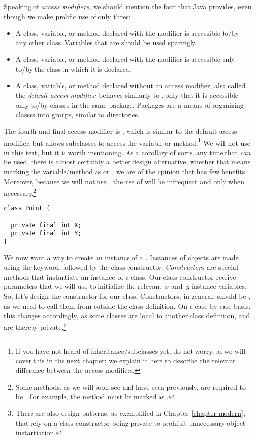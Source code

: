 Speaking of \emph{access modifiers}, we should mention the four that Java provides, even though we make prolific use of only three:

\begin{itemize}
  \item A class, variable, or method declared with the  modifier is accessible to/by any other class. Variables that are  should be used sparingly.
  \item A class, variable, or method declared with the  modifier is accessible only to/by the class in which it is declared. 
  \item A class, variable, or method declared without an access modifier, also called the \emph{default access modifier}, behaves similarly to , only that it is accessible only to/by classes in the same package. Packages are a means of organizing classes into groups, similar to directories.
\end{itemize}

The fourth and final access modifier is , which is similar to the default access modifier, but allows subclasses to access the variable or method.\footnote{If you have not heard of inheritance/subclasses yet, do not worry, as we will cover this in the next chapter; we explain it here to describe the relevant difference between the access modifiers.} 
We will not use  in this text, but it is worth mentioning. 
As a corollary of sorts, any time that  \emph{can} be used, there is almost certainly a better design alternative, whether that means marking the variable/method as  or , we are of the opinion that  has few benefits. 
Moreover, because we will not use , the use of  will be infrequent and only when necessary.\footnote{Some methods, as we will soon see and have seen previously, are required to be . For example, the  method must be marked as .}

\begin{lstlisting}[language=MyJava]
class Point {

  private final int X;
  private final int Y;
}
\end{lstlisting}

We now want a way to create an instance of a . 
Instances of objects are made using the  keyword, followed by the class constructor. 
\emph{Constructors} are special methods that instantiate an instance of a class. 
Our  class constructor receive parameters that we will use to initialize the relevant~$x$ and~$y$ instance variables. 
So, let's design the constructor for our  class. 
Constructors, in general, should be , as we need to call them from outside the class definition. 
On a case-by-case basis, this changes accordingly, as some classes are local to another class definition, and are thereby private.\footnote{There are also design patterns, as exemplified in Chapter~\ref{chapter-modern}, that rely on a class constructor being private to prohibit unnecessary object instantiation.} 

